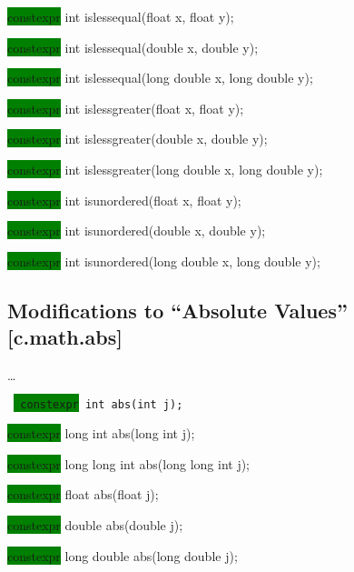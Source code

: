 \documentclass[prd,twocolumn,amsmath,amssymb,nofootinbib,eqsecnum]{revtex4-1}
\newcommand{\code}[1]{{\tt #1}}
\newcommand{\highlight}[1]{\colorbox{green}{\!\!\!\! #1}}
\begin{document}
{\highlight{constexpr} int islessequal(float x, float y);

\highlight{constexpr} int islessequal(double x, double y);

\highlight{constexpr} int islessequal(long double x, long double y);

\vspace{2ex}

\highlight{constexpr} int islessgreater(float x, float y);

\highlight{constexpr} int islessgreater(double x, double y);

\highlight{constexpr} int islessgreater(long double x, long double y);

\vspace{2ex}

\highlight{constexpr} int isunordered(float x, float y);

\highlight{constexpr} int isunordered(double x, double y);

\highlight{constexpr} int isunordered(long double x, long double y);
}

\vspace{2ex}

\subsection{Modifications to  ``Absolute Values''  [c.math.abs]}
\vspace{-2ex}
\ldots
\vspace{2ex}

\code{
	\highlight{constexpr}  int abs(int j);
	
	\highlight{constexpr} long int abs(long int j);
	
	\highlight{constexpr} long long int abs(long long int j);

	\highlight{constexpr} float abs(float j);
	
	\highlight{constexpr}  double abs(double j);

	\highlight{constexpr} long double abs(long double j);
}


\end{document}
